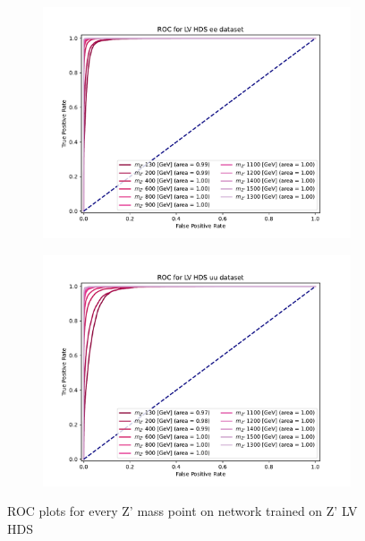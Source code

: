 \documentclass[12pt, a4paper]{book}
\begin{document}
\begin{figure}[!ht]
	\centering
	\begin{subfigure}[b]{0.49\textwidth}
      \centering
      \includegraphics[width=1\textwidth]{XGBoost/LV_HDS/ROC_ee.pdf}
      \end{subfigure}
   \hfill
   \begin{subfigure}[b]{0.49\textwidth}
      \centering
      \includegraphics[width=1\textwidth]{XGBoost/LV_HDS/ROC_uu.pdf}
      \end{subfigure}
   \caption{ROC plots for every Z' mass point on network trained on Z' LV HDS}\label{fig:LV_HDS_ROCS}
\end{figure}
\end{document}
